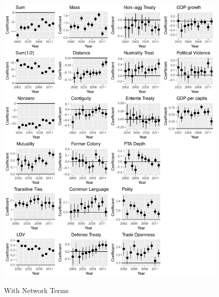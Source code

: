 \documentclass{article}
\begin{document}
\begin{figure}[h]
\centering
\includegraphics[scale=.75]{draft_figures/rl_plot_w.pdf}\\
  \caption{With Network Terms}
  \label{fig:1}
\end{figure}
\end{document}
